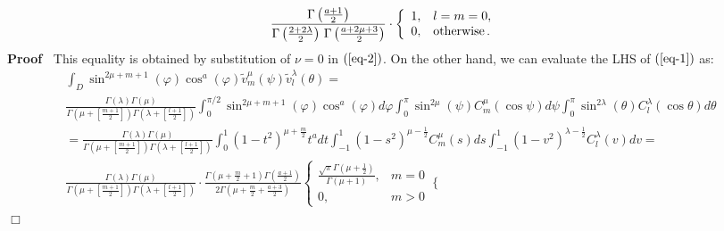 \documentclass{article}
\newcommand{\tmop}[1]{\ensuremath{\operatorname{#1}}}
\newenvironment{enumeratenumeric}{\begin{enumerate}[1.] }{\end{enumerate}}
\newenvironment{proof}{\noindent\textbf{Proof\ }}{\hspace*{\fill}$\Box$\medskip}
{\theorembodyfont{\rmfamily}\newtheorem{answer}{Answer}}
\begin{document}
\begin{answer}
\begin{enumeratenumeric}
\begin{eqnarray}
      \frac{\Gamma \left( \frac{a + 1}{2} \right)}{\Gamma \left( \frac{2 + 2
      \lambda}{2} \right)  \hspace{0.17em} \Gamma \left( \frac{a + 2 \mu +
      3}{2} \right)} \cdot \left\{ \begin{array}{ll}
        1, & l = m = 0,\\
        0, & \tmop{otherwise} .
      \end{array} \right.  \label{eq-1} & 
    \end{eqnarray}
    \begin{proof}
      This equality is obtained by substitution of $\nu = 0$ in
      $(\ref{eq-2})$. On the other hand, we can evaluate the LHS of
      $(\ref{eq-1})$ as:
      \begin{eqnarray}
        & \int_D \sin^{2 \mu + m + 1} (\varphi) \cos^a (\varphi)
        \tilde{v}^{\mu}_m (\psi) \tilde{v}^{\lambda}_l (\theta) = & 
        \nonumber\\
        & \frac{\Gamma (\lambda) \Gamma (\mu)}{\Gamma \left( \mu + \left[
        \frac{m + 1}{2} \right] \right) \Gamma \left( \lambda + \left[ \frac{l
        + 1}{2} \right] \right)} \int_0^{\pi / 2} \sin^{2 \mu + m + 1}
        (\varphi) \cos^a (\varphi) d \varphi \int_0^{\pi} \sin^{2 \mu} (\psi)
        C^{\mu}_m (\cos \psi) d \psi \int_0^{\pi} \sin^{2 \lambda} (\theta)
        C^{\lambda}_l (\cos \theta) d \theta &  \nonumber\\
        & = \frac{\Gamma (\lambda) \Gamma (\mu)}{\Gamma \left( \mu + \left[
        \frac{m + 1}{2} \right] \right) \Gamma \left( \lambda + \left[ \frac{l
        + 1}{2} \right] \right)} \int_0^1 (1 - t^2)^{\mu + \frac{m}{2}} t^a d
        t \int_{- 1}^1 (1 - s^2)^{\mu - \frac{1}{2}} C_m^{\mu} (s) d s \int_{-
        1}^1 (1 - v^2)^{\lambda - \frac{1}{2}} C_l^{\lambda} (v) d v = & 
        \nonumber\\
        & \frac{\Gamma (\lambda) \Gamma (\mu)}{\Gamma \left( \mu + \left[
        \frac{m + 1}{2} \right] \right) \Gamma \left( \lambda + \left[ \frac{l
        + 1}{2} \right] \right)} \cdot \frac{\Gamma \left( \mu + \frac{m}{2} +
        1 \right) \Gamma \left( \frac{a + 1}{2} \right)}{2 \Gamma \left( \mu +
        \frac{m}{2} + \frac{a + 3}{2} \right)} \left\{ \begin{array}{ll}
          \frac{\sqrt{\pi} \Gamma \left( \mu + \frac{1}{2} \right)}{\Gamma
          (\mu + 1)}, & m = 0\\
          0, & m > 0
        \end{array} \right. \left\{ \begin{array}{ll}

\end{array}
\end{eqnarray}
\end{proof}
\end{enumeratenumeric}
\end{answer}
\end{document}
